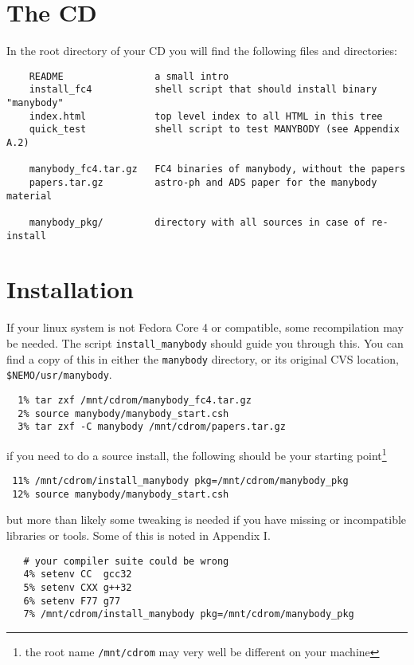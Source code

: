 \section{The CD}
In the root directory of your CD you will find the following files and directories:

\begin{verbatim}
    README                a small intro
    install_fc4           shell script that should install binary "manybody"
    index.html            top level index to all HTML in this tree
    quick_test            shell script to test MANYBODY (see Appendix A.2)

    manybody_fc4.tar.gz   FC4 binaries of manybody, without the papers
    papers.tar.gz         astro-ph and ADS paper for the manybody material

    manybody_pkg/         directory with all sources in case of re-install
\end{verbatim}

\section{Installation}

If your linux system is not Fedora Core 4
or compatible, some recompilation may be needed. The script
{\tt install\_manybody} should guide you through this. You can find a copy
of this in either the {\tt manybody} directory, or its original CVS location,
{\tt \$NEMO/usr/manybody}.

\footnotesize\begin{verbatim}
  1% tar zxf /mnt/cdrom/manybody_fc4.tar.gz
  2% source manybody/manybody_start.csh
  3% tar zxf -C manybody /mnt/cdrom/papers.tar.gz

\end{verbatim}\normalsize

if you need to do a source install, the following should be 
your starting point\footnote{the root name {\tt /mnt/cdrom} may
very well be different on your machine}

\footnotesize\begin{verbatim}
 11% /mnt/cdrom/install_manybody pkg=/mnt/cdrom/manybody_pkg
 12% source manybody/manybody_start.csh
\end{verbatim}\normalsize

but more than likely some tweaking is needed if you have missing or
incompatible libraries or tools. Some of this is noted in Appendix I.


\footnotesize\begin{verbatim}
   # your compiler suite could be wrong
   4% setenv CC  gcc32
   5% setenv CXX g++32
   6% setenv F77 g77
   7% /mnt/cdrom/install_manybody pkg=/mnt/cdrom/manybody_pkg
\end{verbatim}\normalsize



